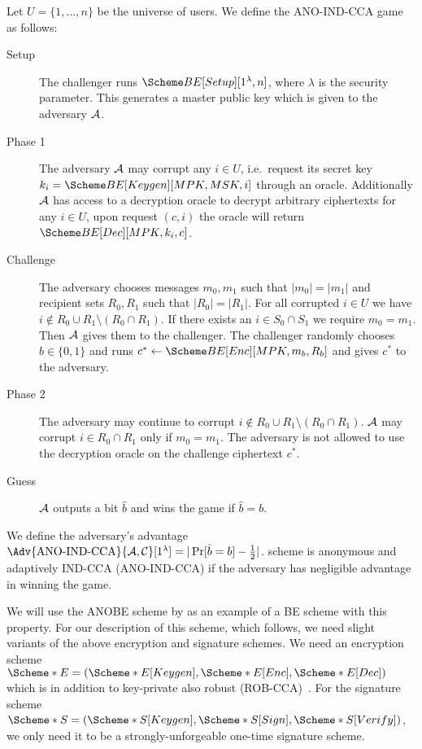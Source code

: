 \begin{definition}\label{ANO-IND-CCA}
  Let \(U = \{1, \ldots, n\}\) be the universe of users.
  We define the ANO-IND-CCA game as follows:
  \begin{description}
    \item[Setup] The challenger runs \(\BE[Setup][1^\lambda, n]\), where 
      \(\lambda\) is the security parameter.
      This generates a master public key which is given to the adversary 
      \(\A\).

    \item[Phase 1] The adversary \(\A\) may corrupt any \(i\in U\), i.e.\ 
      request its secret key \(k_i = \BE[Keygen][MPK, MSK, i]\) through an 
      oracle.
      Additionally \(\A\) has access to a decryption oracle to decrypt 
      arbitrary ciphertexts for any \(i\in U\), upon request \((c, i)\) the 
      oracle will return \(\BE[Dec][MPK, k_i, c]\).

    \item[Challenge] The adversary chooses messages \(m_0, m_1\) such that 
      \(|m_0| = |m_1|\) and recipient sets \(R_0, R_1\) such that \(|R_0| 
        = |R_1|\).
      For all corrupted \(i\in U\) we have \(i\notin R_0\cup R_1\setminus 
        (R_0\cap R_1)\).
      If there exists an \(i\in S_0\cap S_1\) we require \(m_0 = m_1\).
      Then \(\A\) gives them to the challenger.
      The challenger randomly chooses \(b\in \{0, 1\}\) and runs \(c^*\gets 
        \BE[Enc][MPK, m_b, R_b]\) and gives \(c^*\) to the adversary.

    \item[Phase 2] The adversary may continue to corrupt \(i\notin R_0\cup 
        R_1\setminus (R_0\cap R_1)\).
      \(\A\) may corrupt \(i\in R_0\cap R_1\) only if \(m_0 = m_1\).
      The adversary is not allowed to use the decryption oracle on the 
      challenge ciphertext \(c^*\).

    \item[Guess] \(\A\) outputs a bit \(\hat{b}\) and wins the game if 
      \(\hat{b} = b\).

  \end{description}
  We define the adversary's advantage \(\Adv{\text{ANO-IND-CCA}}{\A, 
      \Cop}[1^\lambda] = |\Pr[ \hat{b} = b ] - \frac{1}{2}|\).
   scheme is anonymous and adaptively IND-CCA (ANO-IND-CCA) if the 
  adversary has negligible advantage in winning the game.
\end{definition}

We will use the \ac{ANOBE} scheme by \citet{ANOBE} as an example of a \ac{BE} 
scheme with this property.
For our description of this scheme, which follows, we need slight variants of 
the above encryption and signature schemes.
We need an encryption scheme \(\E* = (\E*[Keygen], \E*[Enc], \E*[Dec])\) which 
is in addition to key-private also robust (ROB-CCA)~\cite{RobustEncryption}.
For the signature scheme \(\S* = (\S*[Keygen], \S*[Sign], \S*[Verify])\), we 
only need it to be a strongly-unforgeable one-time signature scheme.
